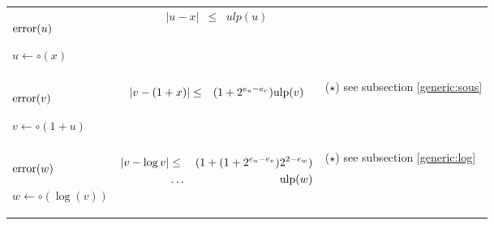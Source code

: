 \documentclass[12pt]{amsart}
\def\ulp{{\rm ulp}}
\begin{document}
\begin{center}
\begin{tabular}{l l l}

\begin{minipage}{2.5cm}


${\textnormal{error}}(u)$


$u \leftarrow \circ(x)$

\end{minipage} &
\begin{minipage}{7.5cm}

\begin{eqnarray}\nonumber
  |u-x| &\leq& ulp(u)\\\nonumber
\end{eqnarray}

\end{minipage} &
\begin{minipage}{6cm}
{\hspace{7cm}}
\end{minipage}\\%
\begin{minipage}{2.5cm}
${\textnormal{error}}(v)$


$v \leftarrow \circ(1+u) $

\end{minipage} &
\begin{minipage}{7.5cm}

\begin{eqnarray}\nonumber
  |v-(1+x)| &\leq& (1+2^{e_u-e_v})\ulp(v)
\end{eqnarray}


\end{minipage} &
\begin{minipage}{6cm}
($\star$)
see subsection \ref{generic:sous}
\end{minipage}\\%
\begin{minipage}{2.5cm}
${\textnormal{error}}(w)$


$w \leftarrow \circ(\log(v)) $

\end{minipage} &
\begin{minipage}{7.5cm}
\begin{eqnarray}\nonumber
  |v-\log{v}| &\leq& (1+(1+2^{e_u-e_v})2^{2-e_w})\\\nonumber
 &\hdots& \ulp(w)
\end{eqnarray}
\end{minipage} &
\begin{minipage}{6cm}
($\star$)
see subsection \ref{generic:log}
\end{minipage}
\end{tabular}
\end{center}
\end{document}
